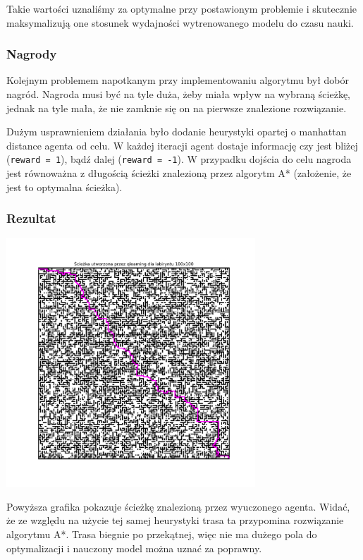 \documentclass[a4paper,12pt]{article}
\begin{document}
    Takie wartości uznaliśmy za optymalne przy postawionym problemie i skutecznie maksymalizują one stosunek wydajności wytrenowanego modelu do czasu nauki.

    \subsubsection{Nagrody}
    Kolejnym problemem napotkanym przy implementowaniu  algorytmu był dobór nagród.
    Nagroda musi być na tyle duża, żeby miała wpływ na wybraną ścieżkę, jednak na tyle mała, że nie zamknie się on na pierwsze znalezione rozwiązanie.
    
    Dużym usprawnieniem działania było dodanie heurystyki opartej o manhattan distance agenta od celu.
    W każdej iteracji agent dostaje informację czy jest bliżej (\texttt{reward = 1}), bądź dalej (\texttt{reward = -1}).
    W przypadku dojścia do celu nagroda jest równoważna z długością ścieżki znalezioną przez algorytm A* (założenie, że jest to optymalna ścieżka).

    \subsubsection{Rezultat}
    
\begin{center}
    \includegraphics[width = 0.7\textwidth]{../images/qlearning_path.png}
\end{center}

    Powyższa grafika pokazuje ścieżkę znalezioną przez wyuczonego agenta. Widać, że ze względu na użycie tej samej heurystyki trasa ta przypomina rozwiązanie algorytmu A*.
    Trasa biegnie po przekątnej, więc nie ma dużego pola do optymalizacji i nauczony model można uznać za poprawny.
    
\end{document}
